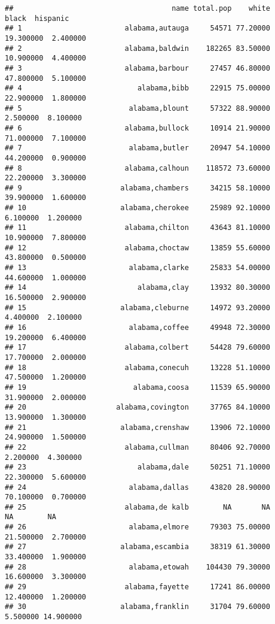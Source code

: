 \documentclass[
]{article}
\begin{document}
\begin{verbatim}
##                                     name total.pop    white     black  hispanic
## 1                        alabama,autauga     54571 77.20000 19.300000  2.400000
## 2                        alabama,baldwin    182265 83.50000 10.900000  4.400000
## 3                        alabama,barbour     27457 46.80000 47.800000  5.100000
## 4                           alabama,bibb     22915 75.00000 22.900000  1.800000
## 5                         alabama,blount     57322 88.90000  2.500000  8.100000
## 6                        alabama,bullock     10914 21.90000 71.000000  7.100000
## 7                         alabama,butler     20947 54.10000 44.200000  0.900000
## 8                        alabama,calhoun    118572 73.60000 22.200000  3.300000
## 9                       alabama,chambers     34215 58.10000 39.900000  1.600000
## 10                      alabama,cherokee     25989 92.10000  6.100000  1.200000
## 11                       alabama,chilton     43643 81.10000 10.900000  7.800000
## 12                       alabama,choctaw     13859 55.60000 43.800000  0.500000
## 13                        alabama,clarke     25833 54.00000 44.600000  1.000000
## 14                          alabama,clay     13932 80.30000 16.500000  2.900000
## 15                      alabama,cleburne     14972 93.20000  4.400000  2.100000
## 16                        alabama,coffee     49948 72.30000 19.200000  6.400000
## 17                       alabama,colbert     54428 79.60000 17.700000  2.000000
## 18                       alabama,conecuh     13228 51.10000 47.500000  1.200000
## 19                         alabama,coosa     11539 65.90000 31.900000  2.000000
## 20                     alabama,covington     37765 84.10000 13.900000  1.300000
## 21                      alabama,crenshaw     13906 72.10000 24.900000  1.500000
## 22                       alabama,cullman     80406 92.70000  2.200000  4.300000
## 23                          alabama,dale     50251 71.10000 22.300000  5.600000
## 24                        alabama,dallas     43820 28.90000 70.100000  0.700000
## 25                       alabama,de kalb        NA       NA        NA        NA
## 26                        alabama,elmore     79303 75.00000 21.500000  2.700000
## 27                      alabama,escambia     38319 61.30000 33.400000  1.900000
## 28                        alabama,etowah    104430 79.30000 16.600000  3.300000
## 29                       alabama,fayette     17241 86.00000 12.400000  1.200000
## 30                      alabama,franklin     31704 79.60000  5.500000 14.900000

\end{verbatim}
\end{document}
